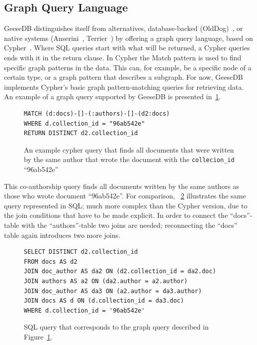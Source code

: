\subsection{Graph Query Language}
GeeseDB distinguishes itself from alternatives, database-backed (OldDog)~\citep{olddog-docker}, or native systems (Anserini~\citep{anserini}, Terrier~\citep{terrier}) by offering a graph query language, based on Cypher~\citep{cypher}. 
Where SQL queries start with what will be returned, a Cypher queries ends with it in the return clause. In Cypher  the Match pattern is used to find specific graph patterns in the data. This can, for example, be a specific node of a certain type, or a graph pattern that describes a subgraph. 
For now, GeeseDB implements Cypher's basic graph pattern-matching queries for retrieving data. An example of a graph query supported by GeeseDB is presented in~\cref{fig:graph_query}.
\begin{figure}
	\begin{verbatim}
MATCH (d:docs)-[]-(:authors)-[]-(d2:docs)
WHERE d.collection_id = "96ab542e"
RETURN DISTINCT d2.collection_id
	\end{verbatim}
	\caption{An example cypher query that finds all documents that were written by the same author that wrote the document with the \texttt{collecion\_id} ``96ab542e''}
	\label{fig:graph_query}
\end{figure}
This co-authorship query finds all documents written by the same authors as those who wrote document ``96ab542e''. For comparison, ~\cref{fig:corresponding_sql} illustrates the same query represented in SQL; much more complex than the Cypher version, due to the join conditions that have to be made explicit. In order to connect the ``docs''-table with the ``authors''-table two joins are needed; reconnecting the ``docs'' table again introduces two more joins.

\begin{figure}
	\begin{verbatim}
SELECT DISTINCT d2.collection_id
FROM docs AS d2
JOIN doc_author AS da2 ON (d2.collection_id = da2.doc)
JOIN authors AS a2 ON (da2.author = a2.author)
JOIN doc_author AS da3 ON (a2.author = da3.author)
JOIN docs AS d ON (d.collection_id = da3.doc)
WHERE d.collection_id = '96ab542e'
	\end{verbatim}
	\caption{SQL query that corresponds to the graph query described in Figure~\ref{fig:graph_query}.}
	\label{fig:corresponding_sql}
\end{figure}

